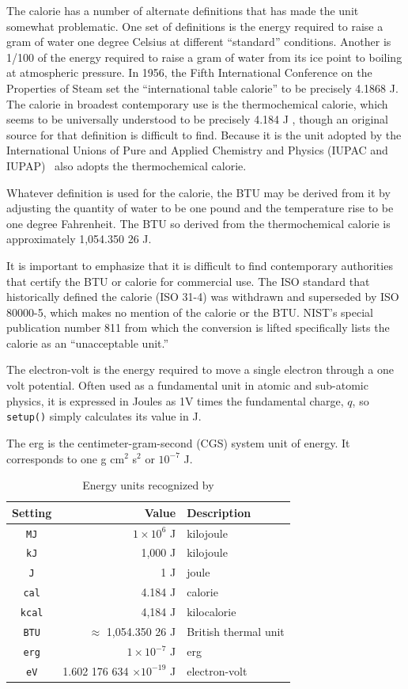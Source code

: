 The calorie has a number of alternate definitions that has made the unit somewhat problematic.  One set of definitions is the energy required to raise a gram of water one degree Celsius at different ``standard'' conditions.  Another is 1/100 of the energy required to raise a gram of water from its ice point to boiling at atmospheric pressure.  In 1956, the Fifth International Conference on the Properties of Steam set the ``international table calorie'' to be precisely 4.1868 J.  The calorie in broadest contemporary use is the thermochemical calorie, which seems to be universally understood to be precisely 4.184 J  \cite{nist:sp811}, though an original source for that definition is difficult to find.  Because it is the unit adopted by the International Unions of Pure and Applied Chemistry and Physics (IUPAC and IUPAP) \cite{crc} \PM\ also adopts the thermochemical calorie.

Whatever definition is used for the calorie, the BTU may be derived from it by adjusting the quantity of water to be one pound and the temperature rise to be one degree Fahrenheit.  The BTU so derived from the thermochemical calorie is approximately 1,054.350 26 J.

It is important to emphasize that it is difficult to find contemporary authorities that certify the BTU or calorie for commercial use.  The ISO standard that historically defined the calorie (ISO 31-4) was withdrawn and superseded by ISO 80000-5, which makes no mention of the calorie or the BTU.  NIST's special publication number 811 from which the conversion is lifted specifically lists the calorie as an ``unacceptable unit.''

The electron-volt is the energy required to move a single electron through a one volt potential.  Often used as a fundamental unit in atomic and sub-atomic physics, it is expressed in Joules as 1V times the fundamental charge, $q$, so \texttt{setup()} simply calculates its value in J.

The erg is the centimeter-gram-second (CGS) system unit of energy.  It corresponds to one g cm${^2}$ s${^2}$ or $10^{-7}$ J.

\begin{table}
\centering
\caption{Energy units recognized by \PM}\label{tab:energy}
\begin{tabular}{crl}
\hline
Setting & Value & Description\\
\hline
\verb|MJ| & $1 \times 10^{6}$  J & kilojoule\\
\verb|kJ| & 1,000 J & kilojoule\\
\verb|J| & 1 J & joule\\
\verb|cal| & 4.184 J & calorie\\
\verb|kcal| & 4,184 J & kilocalorie\\
\verb|BTU| & $\approx$ 1,054.350 26 J & British thermal unit\\
\verb|erg| & $1 \times 10^{-7}$ J & erg\\
\verb|eV| & 1.602 176 634 $\times 10^{-19}$ J & electron-volt\\
\hline
\end{tabular}
\end{table}

